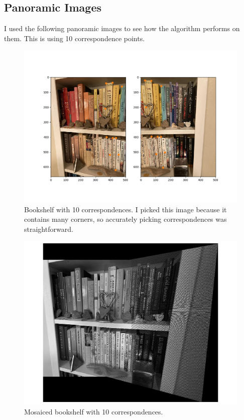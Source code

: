 \documentclass[]{article}
\begin{document}
	
	\newpage
	
	\subsection{Panoramic Images}
		I used the following panoramic images to see how the algorithm performs on them. This is using 10 correspondence points.

	
	\begin{figure}[H]
		\centering
		\includegraphics[width=6.5in]{test_images/shelf_10_correspondences.png}
		\caption{Bookshelf with 10 correspondences. I picked this image because it contains many corners, so accurately picking correspondences was straightforward.}
	\end{figure}

	\begin{figure}[H]
		\centering
		\includegraphics[width=6.5in]{test_images/shelf_10_floor.png}
		\caption{Mosaiced bookshelf with 10 correspondences. }
	\end{figure}
\end{document}
